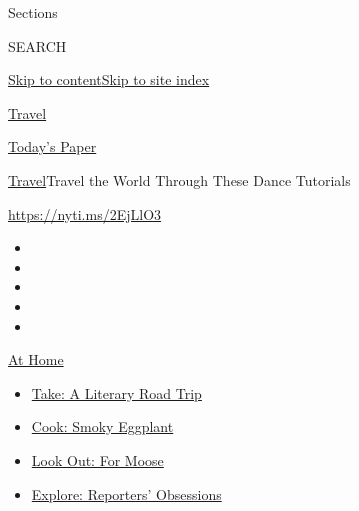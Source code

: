 Sections

SEARCH

\protect\hyperlink{site-content}{Skip to
content}\protect\hyperlink{site-index}{Skip to site index}

\href{https://www.nytimes3xbfgragh.onion/section/travel}{Travel}

\href{https://myaccount.nytimes3xbfgragh.onion/auth/login?response_type=cookie\&client_id=vi}{}

\href{https://www.nytimes3xbfgragh.onion/section/todayspaper}{Today's
Paper}

\href{/section/travel}{Travel}\textbar{}Travel the World Through These
Dance Tutorials

\url{https://nyti.ms/2EjLlO3}

\begin{itemize}
\item
\item
\item
\item
\item
\end{itemize}

\href{https://www.nytimes3xbfgragh.onion/spotlight/at-home?action=click\&pgtype=Article\&state=default\&region=TOP_BANNER\&context=at_home_menu}{At
Home}

\begin{itemize}
\tightlist
\item
  \href{https://www.nytimes3xbfgragh.onion/2020/07/28/books/time-for-a-literary-road-trip.html?action=click\&pgtype=Article\&state=default\&region=TOP_BANNER\&context=at_home_menu}{Take:
  A Literary Road Trip}
\item
  \href{https://www.nytimes3xbfgragh.onion/2020/07/29/magazine/bored-with-your-home-cooking-some-smoky-eggplant-will-fix-that.html?action=click\&pgtype=Article\&state=default\&region=TOP_BANNER\&context=at_home_menu}{Cook:
  Smoky Eggplant}
\item
  \href{https://www.nytimes3xbfgragh.onion/2020/07/27/travel/moose-michigan-isle-royale.html?action=click\&pgtype=Article\&state=default\&region=TOP_BANNER\&context=at_home_menu}{Look
  Out: For Moose}
\item
  \href{https://www.nytimes3xbfgragh.onion/interactive/2020/at-home/even-more-reporters-editors-diaries-lists-recommendations.html?action=click\&pgtype=Article\&state=default\&region=TOP_BANNER\&context=at_home_menu}{Explore:
  Reporters' Obsessions}
\end{itemize}

